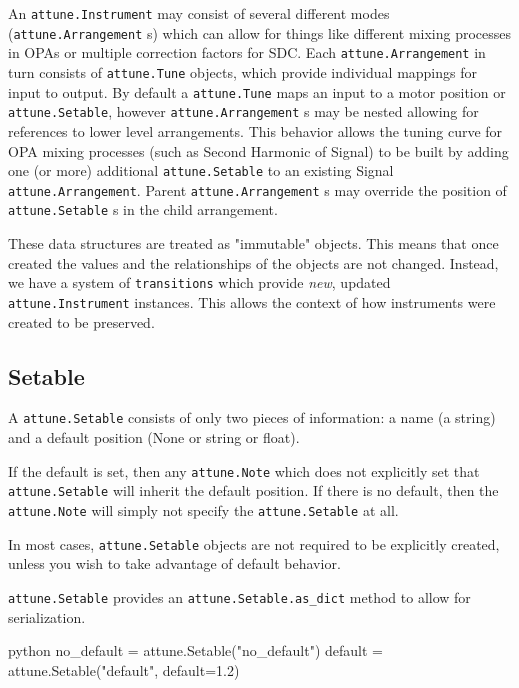 An \texttt{attune.Instrument} may consist of several
different modes (\texttt{attune.Arrangement} s) which
can allow for things like different mixing processes in OPAs or multiple
correction factors for SDC. Each
\texttt{attune.Arrangement} in turn consists of
\texttt{attune.Tune} objects, which provide individual
mappings for input to output. By default a
\texttt{attune.Tune} maps an input to a motor position
or \texttt{attune.Setable}, however
\texttt{attune.Arrangement} s may be nested allowing
for references to lower level arrangements. This behavior allows the
tuning curve for OPA mixing processes (such as Second Harmonic of
Signal) to be built by adding one (or more) additional
\texttt{attune.Setable} to an existing Signal
\texttt{attune.Arrangement}. Parent
\texttt{attune.Arrangement} s may override the position
of \texttt{attune.Setable} s in the child arrangement.

These data structures are treated as "immutable" objects. This means
that once created the values and the relationships of the objects are
not changed. Instead, we have a system of \texttt{transitions} which
provide \emph{new}, updated \texttt{attune.Instrument}
instances. This allows the context of how instruments were created to be
preserved.

\hypertarget{setable}{%
\subsection{Setable}\label{setable}}

A \texttt{attune.Setable} consists of only two pieces
of information: a name (a string) and a default position (None or string
or float).

If the default is set, then any \texttt{attune.Note}
which does not explicitly set that
\texttt{attune.Setable} will inherit the default
position. If there is no default, then the
\texttt{attune.Note} will simply not specify the
\texttt{attune.Setable} at all.

In most cases, \texttt{attune.Setable} objects are not
required to be explicitly created, unless you wish to take advantage of
default behavior.

\texttt{attune.Setable} provides an
\texttt{attune.Setable.as\_dict} method to allow for
serialization.

\begin{codefragment}{python}
no_default = attune.Setable("no_default")
default = attune.Setable("default", default=1.2)
\end{codefragment}

